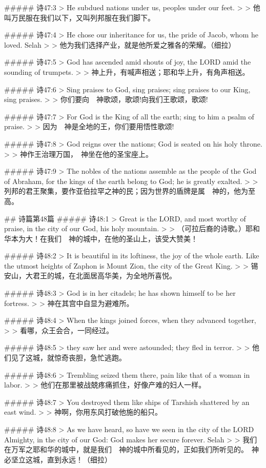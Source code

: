 ##### 诗47:3
> He subdued nations under us, peoples under our feet.
>
> 他叫万民服在我们以下，又叫列邦服在我们脚下。


##### 诗47:4
> He chose our inheritance for us, the pride of Jacob, whom he loved. Selah
>
> 他为我们选择产业，就是他所爱之雅各的荣耀。（细拉）


##### 诗47:5
> God has ascended amid shouts of joy, the LORD amid the sounding of trumpets.
>
> 神上升，有喊声相送；耶和华上升，有角声相送。


##### 诗47:6
> Sing praises to God, sing praises; sing praises to our King, sing praises.
>
> 你们要向　神歌颂，歌颂!向我们王歌颂，歌颂!


##### 诗47:7
> For God is the King of all the earth; sing to him a psalm of praise.
>
> 因为　神是全地的王，你们要用悟性歌颂!


##### 诗47:8
> God reigns over the nations; God is seated on his holy throne.
>
> 神作王治理万国，　神坐在他的圣宝座上。


##### 诗47:9
> The nobles of the nations assemble as the people of the God of Abraham, for the kings of the earth belong to God; he is greatly exalted.
>
> 列邦的君王聚集，要作亚伯拉罕之神的民；因为世界的盾牌是属　神的，他为至高。


## 诗篇第48篇
##### 诗48:1
> Great is the LORD, and most worthy of praise, in the city of our God, his holy mountain.
>
> （可拉后裔的诗歌。）耶和华本为大！在我们　神的城中，在他的圣山上，该受大赞美！


##### 诗48:2
> It is beautiful in its loftiness, the joy of the whole earth. Like the utmost heights of Zaphon is Mount Zion, the city of the Great King.
>
> 锡安山，大君王的城，在北面居高华美，为全地所喜悦。


##### 诗48:3
> God is in her citadels; he has shown himself to be her fortress.
>
> 神在其宫中自显为避难所。


##### 诗48:4
> When the kings joined forces, when they advanced together,
>
> 看哪，众王会合，一同经过。


##### 诗48:5
> they saw her and were astounded; they fled in terror.
>
> 他们见了这城，就惊奇丧胆，急忙逃跑。


##### 诗48:6
> Trembling seized them there, pain like that of a woman in labor.
>
> 他们在那里被战兢疼痛抓住，好像产难的妇人一样。


##### 诗48:7
> You destroyed them like ships of Tarshish shattered by an east wind.
>
> 神啊，你用东风打破他施的船只。


##### 诗48:8
> As we have heard, so have we seen in the city of the LORD Almighty, in the city of our God: God makes her secure forever. Selah
>
> 我们在万军之耶和华的城中，就是我们　神的城中所看见的，正如我们所听见的。　神必坚立这城，直到永远！（细拉）


